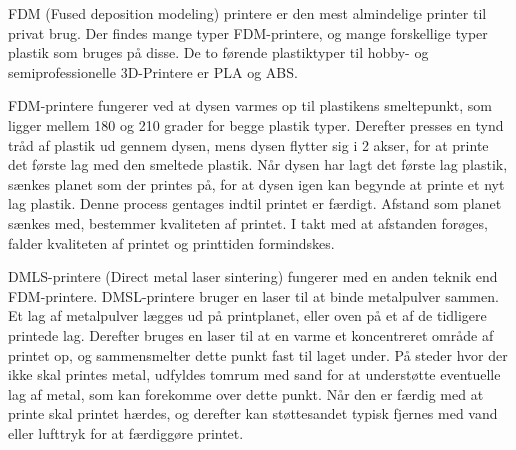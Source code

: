 FDM (Fused deposition modeling) printere er den mest almindelige printer til privat brug. Der findes mange typer FDM-printere, og mange forskellige typer plastik som bruges på disse. De to førende plastiktyper til hobby- og semiprofessionelle 3D-Printere er PLA og ABS.\autocite{3d-guide:_????} 

FDM-printere fungerer ved at dysen varmes op til plastikens smeltepunkt, som ligger mellem 180 og 210 grader for begge plastik typer. Derefter presses en tynd tråd af plastik ud gennem dysen, mens dysen flytter sig i 2 akser, for at printe det første lag med den smeltede plastik. 
Når dysen har lagt det første lag plastik, sænkes planet som der printes på, for at dysen igen kan begynde at printe et nyt lag plastik. Denne process gentages indtil printet er færdigt. 
Afstand som planet sænkes med, bestemmer kvaliteten af printet. I takt med at afstanden forøges, falder kvaliteten af printet og printtiden formindskes.


DMLS-printere (Direct metal laser sintering) fungerer med en anden teknik end FDM-printere. DMSL-printere bruger en laser til at binde metalpulver sammen. Et lag af metalpulver lægges ud på printplanet, eller oven på et af de tidligere printede lag. Derefter bruges en laser til at en varme et koncentreret område af printet op, og sammensmelter dette punkt fast til laget under. På steder hvor der ikke skal printes metal, udfyldes tomrum med sand for at understøtte eventuelle lag af metal, som kan forekomme over dette punkt.\autocite{manyika_disruptive_2013}
Når den er færdig med at printe skal printet hærdes, og derefter kan støttesandet typisk fjernes med vand eller lufttryk for at færdiggøre printet\autocite{manyika_disruptive_2013}.
\newpage



